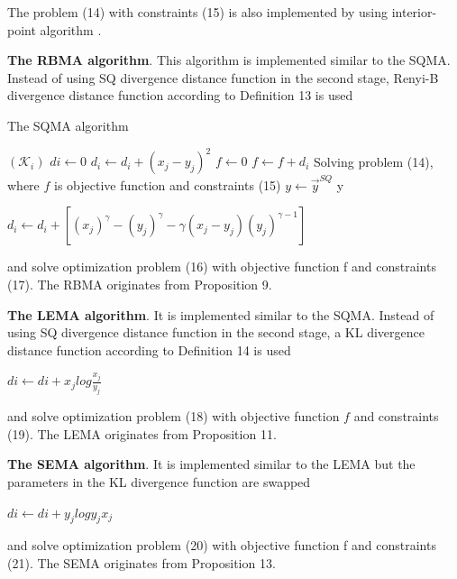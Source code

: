 \documentclass[]{iosart2c}
\begin{document}
  The problem (14) with constraints (15) is also
  implemented by using interior-point algorithm \cite{29}.

  \textbf{The RBMA algorithm}. This algorithm is implemented
  similar to the SQMA. Instead of using SQ
  divergence distance function in the second stage,
  Renyi-B divergence distance function according to
  Definition 13 is used

  \begin{algorithm}
    \caption{The SQMA algorithm}
    \begin{algorithmic}[1]
        \State $(\mathcal{K}_i )$
      \EndFor
        \State $di \gets 0$
          \State $d_i \gets d_i + (x_j - y_j)^2$
        \EndFor
      \EndFor
      \State $f \gets 0$
        \State $f \gets f + d_i$
      \EndFor
      \State Solving problem (14), where $f$ is objective function and
      constraints (15)
      \State $y \gets \vec{y}^{SQ}$
      \State \Return y
    \end{algorithmic}
  \end{algorithm}

  $d_i \gets d_i + \left[ (x_j)^\gamma - (y_j)^\gamma - \gamma(x_j - y_j)(y_j)^{\gamma-1} \right]$

  and solve optimization problem (16) with objective function f and constraints (17). The RBMA originates from Proposition
  9.

  \textbf{The LEMA algorithm}. It is implemented similar
  to the SQMA. Instead of using SQ divergence distance
  function in the second stage, a KL divergence
  distance function according to Definition 14 is used

  $di \gets di + x_j log{\frac{x_j}{y_j}}$

  and solve optimization problem (18) with objective function $f$ and constraints (19). The LEMA originates from Proposition 11.

  \textbf{The SEMA algorithm}. It is implemented similar to the LEMA but the parameters in the KL divergence function are swapped

  $di \gets di + y_j log{{y_j}{x_j}}$

  and solve optimization problem (20) with objective function f and constraints (21). The SEMA originates from Proposition 13.
\end{document}
